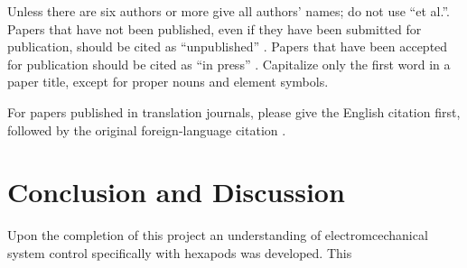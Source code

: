 Unless there are six authors or more give all authors' names; do not use 
``et al.''. Papers that have not been published, even if they have been 
submitted for publication, should be cited as ``unpublished'' \cite{gabriel1996dielectricI}. Papers 
that have been accepted for publication should be cited as ``in press'' \cite{gabriel1996dielectricI}. 
Capitalize only the first word in a paper title, except for proper nouns and 
element symbols.



For papers published in translation journals, please give the English 
citation first, followed by the original foreign-language citation \cite{khadem2019geometric}.












\section{Conclusion and Discussion}


Upon the completion of this project an understanding of electromcechanical system control specifically with hexapods was developed. This 










